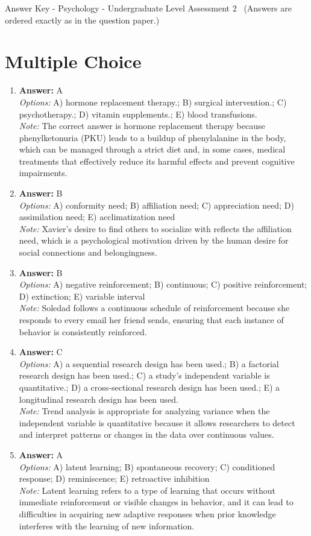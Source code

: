 \documentclass[12pt]{article}
\begin{document}
\begin{center}
Answer Key - Psychology - Undergraduate Level Assessment 2 \
\small (Answers are ordered exactly as in the question paper.)
\end{center}

\section*{Multiple Choice}
\begin{enumerate}[label=\arabic*.]
\item \textbf{Answer:} A
\\ \textit{Options:} A) hormone replacement therapy.; B) surgical intervention.; C) psychotherapy.; D) vitamin supplements.; E) blood transfusions.
\\ \textit{Note:} The correct answer is hormone replacement therapy because phenylketonuria (PKU) leads to a buildup of phenylalanine in the body, which can be managed through a strict diet and, in some cases, medical treatments that effectively reduce its harmful effects and prevent cognitive impairments.
\item \textbf{Answer:} B
\\ \textit{Options:} A) conformity need; B) affiliation need; C) appreciation need; D) assimilation need; E) acclimatization need
\\ \textit{Note:} Xavier's desire to find others to socialize with reflects the affiliation need, which is a psychological motivation driven by the human desire for social connections and belongingness.
\item \textbf{Answer:} B
\\ \textit{Options:} A) negative reinforcement; B) continuous; C) positive reinforcement; D) extinction; E) variable interval
\\ \textit{Note:} Soledad follows a continuous schedule of reinforcement because she responds to every email her friend sends, ensuring that each instance of behavior is consistently reinforced.
\item \textbf{Answer:} C
\\ \textit{Options:} A) a sequential research design has been used.; B) a factorial research design has been used.; C) a study's independent variable is quantitative.; D) a cross-sectional research design has been used.; E) a longitudinal research design has been used.
\\ \textit{Note:} Trend analysis is appropriate for analyzing variance when the independent variable is quantitative because it allows researchers to detect and interpret patterns or changes in the data over continuous values.
\item \textbf{Answer:} A
\\ \textit{Options:} A) latent learning; B) spontaneous recovery; C) conditioned response; D) reminiscence; E) retroactive inhibition
\\ \textit{Note:} Latent learning refers to a type of learning that occurs without immediate reinforcement or visible changes in behavior, and it can lead to difficulties in acquiring new adaptive responses when prior knowledge interferes with the learning of new information.
\end{enumerate}
\end{document}
